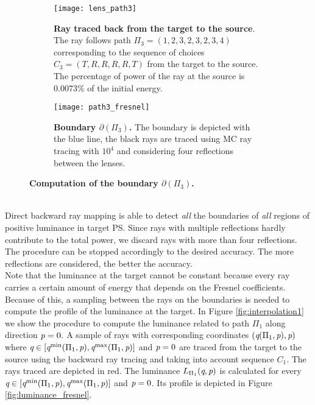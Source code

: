 \begin{figure}[t]
\centering
\begin{subfigure}[t]{.45\textwidth}
  \texttt{[image: lens\_path3]}
 \caption{\textbf{Ray traced back from the target to the source}. The ray follows path $\Pi_3 = (1,2,3,2,3,2,3,4)$ corresponding to the sequence of choices $C_3=(T,R,R,R,R,T)$ from the target to the source. The percentage of power of the ray at the source is $0.0073\%$ of the initial energy.}
  \label{fig:ray_path3}
\end{subfigure}%
\hfill
\begin{subfigure}[t]{.45\textwidth}
  \texttt{[image: path3\_fresnel]}
  \caption{\textbf{Boundary $\partial$$(\Pi_3)$.} The boundary is depicted with the blue line, the black rays are traced using MC ray tracing with $10^4$ and considering four reflections between the lenses.} %
  \label{fig:boundary_path3}
\end{subfigure} %
\caption{\textbf{Computation of the boundary $\partial$$(\Pi_3)$.}}
\end{figure}
\\ \indent 
Direct backward ray mapping is able to detect \textit{all} the boundaries of \textit{all} regions of positive luminance in target PS. Since rays with multiple reflections hardly contribute to the total power, we discard rays with more than four reflections. The procedure can be stopped accordingly to the desired accuracy. The more reflections are considered, the better the accuracy. \\ \indent
Note that the luminance at the target cannot be constant because every ray carries a certain amount of energy that depends on the Fresnel coefficients. Because of this, a sampling between the rays on the boundaries is needed to compute the profile of the luminance at the target. In Figure \ref{fig:interpolation1} we show the procedure to compute the luminance related to path $\Pi_1$ along direction $\textit{p}=0$. A sample of rays with corresponding coordinates $(\textit{q}(\Pi_1, \textit{p}), \textit{p})$ where $\textit{q}\in[\textit{q}^{\textrm{min}}(\Pi_1,\textit{p}), \textit{q}^{\textrm{max}}(\Pi_1,\textit{p})]$ and $\textit{p}=0$ are traced from the target to the source using the backward ray tracing and taking into account sequence $C_1$. The rays traced are depicted in red. The luminance $L_{\Pi_1}(\textit{q}, \textit{p})$ is calculated for every $\textit{q}\in[\textit{q}^{\textrm{min}}(\Pi_1,\textit{p}), \textit{q}^{\textrm{max}}(\Pi_1,\textit{p})]$ and $\textit{p}=0$. Its profile is depicted in Figure \ref{fig:luminance_fresnel}.
